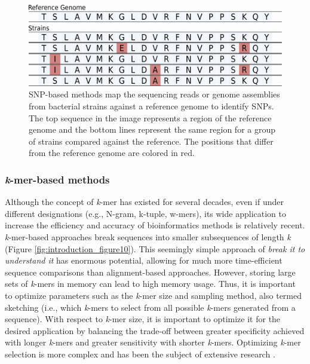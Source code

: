 \begin{figure}[h!]
    \centering
    \includegraphics[angle=0,width=\textwidth]{figures/introduction/Figure9.pdf}
    \caption[SNP-based methods]{SNP-based methods map the sequencing reads or genome assemblies from bacterial strains against a reference genome to identify \ac{SNPs}. The top sequence in the image represents a region of the reference genome and the bottom lines represent the same region for a group of strains compared against the reference. The positions that differ from the reference genome are colored in red.}
    \label{fig:introduction_figure9}
\end{figure}

\subsubsection{\textit{k}-mer-based methods}

Although the concept of \textit{k}-mer has existed for several decades, even if under different designations (e.g., N-gram, k-tuple, w-mers), its wide application to increase the efficiency and accuracy of bioinformatics methods is relatively recent. \textit{k}-mer-based approaches break sequences into smaller subsequences of length \textit{k} (Figure \ref{fig:introduction_figure10}). This seemingly simple approach of \textit{break it to understand it} has enormous potential, allowing for much more time-efficient sequence comparisons than alignment-based approaches. However, storing large sets of \textit{k}-mers in memory can lead to high memory usage. Thus, it is important to optimize parameters such as the \textit{k}-mer size and sampling method, also termed sketching (i.e., which \textit{k}-mers to select from all possible \textit{k}-mers generated from a sequence). With respect to \textit{k}-mer size, it is important to optimize it for the desired application by balancing the trade-off between greater specificity achieved with longer \textit{k}-mers and greater sensitivity with shorter \textit{k}-mers. Optimizing \textit{k}-mer selection is more complex and has been the subject of extensive research \cite{roberts_reducing_2004, sahlin_effective_2021, ndiaye_when_2024, karami_designing_2024, kille_minmers_2023, shaw_theory_2022}.

